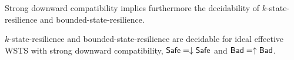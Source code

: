 

Strong downward compatibility implies furthermore the decidability
of {\sc $k$-state-resilience} and {\sc bounded-state-resilience}.

\begin{proposition}\label{downward brp}
{\sc $k$-state-resilience} and {\sc bounded-state-resilience} are decidable for ideal effective WSTS with strong downward compatibility,
$\textsf{Safe} = \downarrow \textsf{Safe}$ and $\textsf{Bad} = \uparrow \textsf{Bad}$.
\end{proposition}




